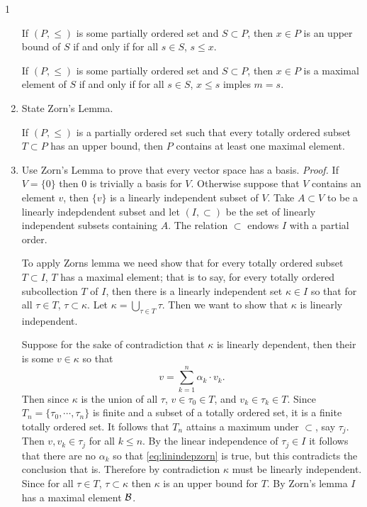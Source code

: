\documentclass{exercises}
\begin{document}
\begin{exr}{}{1}
\begin{enumerate}
		\begin{definition}
			If $(P, \leq)$ is some partially ordered set and $S \subset P$, then $x \in P$ is an upper bound of $S$ if and only if for all $s \in S$, $s \leq x.$
		\end{definition}

		\begin{definition}
			If $(P, \leq)$ is some partially ordered set and $S \subset P$, then $x \in P$ is a maximal element of $S$ if and only if for all $s \in S$, $x \leq s$ imples $m = s.$
		\end{definition}
		\item State Zorn's Lemma.
		\begin{lemma}
			If $(P, \leq)$ is a partially ordered set such that every totally ordered subset $T \subset P$ has an upper bound, then $P$ contains at least one maximal element.
		\end{lemma}
		\item Use Zorn's Lemma to prove that every vector space has a basis.
		\emph{Proof. }
			If $V = \{0\}$ then $0$ is trivially a basis for $V$. Otherwise suppose that $V$ contains an element $v$, then $\{v\}$ is a linearly independent subset of $V$. Take $A \subset V$ to be a linearly indepdendent subset and let $(I, \subset)$ be the set of linearly independent subsets containing $A$. The relation $\subset$ endows $I$ with a partial order. 

			To apply Zorns lemma we need show that for every totally ordered subset $T \subset I$, $T$ has a maximal element; that is to say, for every totally ordered subcollection $T$ of $I$, then there is a linearly independent set $\kappa \in I$ so that for all $\tau \in T$, $\tau \subset \kappa$. Let $\kappa = \bigcup_{\tau \in T} \tau.$ Then we want to show that $\kappa$ is  linearly independent. 

			Suppose for the sake of contradiction that $\kappa$ is linearly dependent, then their is some $v \in \kappa$ so that
			\begin{equation}\label{eq:linindepzorn}
			 	v = \sum_{k=1}^n \alpha_k \cdot v_k.
			 \end{equation} 
			Then since $\kappa$ is the union of all $\tau$, $v \in \tau_0 \in T$, and $v_k \in \tau_k \in T$. Since $T_n = \{\tau_0, \cdots, \tau_n\}$ is finite and a subset of a totally ordered set, it is a finite totally ordered set. It follows that $T_n$ attains a maximum under $\subset$, say $\tau_j$. Then $v, v_k \in \tau_j$ for all $k \leq n$. By the linear independence of $\tau_j \in I$ it follows that there are no $\alpha_k$ so that \eqref{eq:linindepzorn} is true, but this contradicts the conclusion that is. Therefore by contradiction $\kappa$ must be linearly independent. Since for all $\tau \in T$, $\tau \subset \kappa$ then $\kappa$ is an upper bound for $T$. By Zorn's lemma $I$ has a maximal element $\scriptb$. 


\end{enumerate}
\end{exr}
\end{document}
